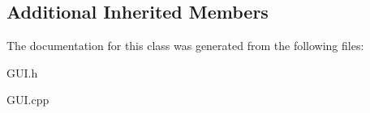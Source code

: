 \subsection*{Additional Inherited Members}


The documentation for this class was generated from the following files\+:\begin{DoxyCompactItemize}
\item 
G\+U\+I.\+h\item 
G\+U\+I.\+cpp\end{DoxyCompactItemize}
